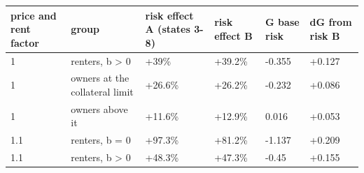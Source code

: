 \begingroup\small
\setlength{\tabcolsep}{3pt}
\renewcommand{\arraystretch}{1.04}
\begin{tabularx}{\linewidth}{XXXXXX}
\toprule
price and rent factor & group & risk effect A (states 3-8) & risk effect B & G base risk & dG from risk B \\
\midrule
1 & renters, b \textgreater{} 0 & +39\% & +39.2\% & -0.355 & +0.127 \\
1 & owners at the collateral limit & +26.6\% & +26.2\% & -0.232 & +0.086 \\
1 & owners above it & +11.6\% & +12.9\% & 0.016 & +0.053 \\
1.1 & renters, b = 0 & +97.3\% & +81.2\% & -1.137 & +0.209 \\
1.1 & renters, b \textgreater{} 0 & +48.3\% & +47.3\% & -0.45 & +0.155 \\
\bottomrule
\end{tabularx}
\endgroup
